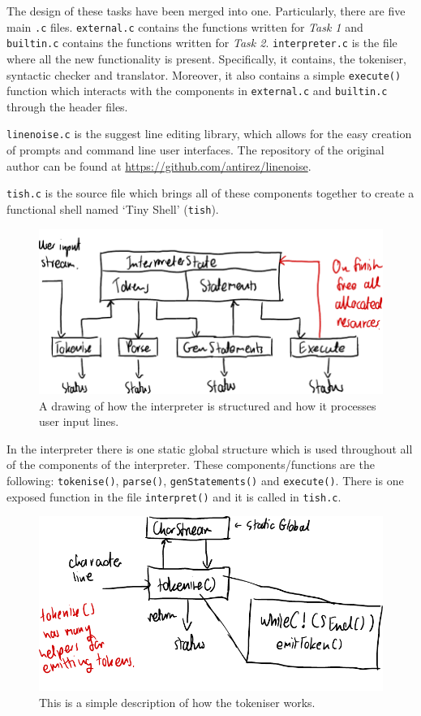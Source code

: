 \documentclass[12pt]{article}
\begin{document}
The design of these tasks have been merged into one.
Particularly, there are five main \texttt{.c} files.
\texttt{external.c} contains the functions written for
\textit{Task 1} and \texttt{builtin.c} contains the functions
written for \textit{Task 2}. \texttt{interpreter.c} is the file
where all the new functionality is present. Specifically, it
contains, the tokeniser, syntactic checker and translator.
Moreover, it also contains a simple \texttt{execute()} function
which interacts with the components in \texttt{external.c} and
\texttt{builtin.c} through the header files.

\texttt{linenoise.c} is the suggest line editing library, which
allows for the easy creation of prompts and command line user
interfaces. The repository of the original author can be found
at \url{https://github.com/antirez/linenoise}.

\texttt{tish.c} is the source file which brings all of these
components together to create a functional shell named `Tiny
Shell' (\texttt{tish}).

\begin{figure}[H]
\centering
\includegraphics{interpreter-arch}
\caption{A drawing of how the interpreter is structured and how
it processes user input lines.}
\end{figure}

In the interpreter there is one static global structure which is
used throughout all of the components of the interpreter. These
components/functions are the following: \texttt{tokenise()},
\texttt{parse()}, \texttt{genStatements()} and
\texttt{execute()}. There is one exposed function in the file
\texttt{interpret()} and it is called in \texttt{tish.c}.

\begin{figure}[H]
\centering
\includegraphics{tokeniser}
\caption{This is a simple description of how the
tokeniser works.}
\end{figure}
\end{document}

